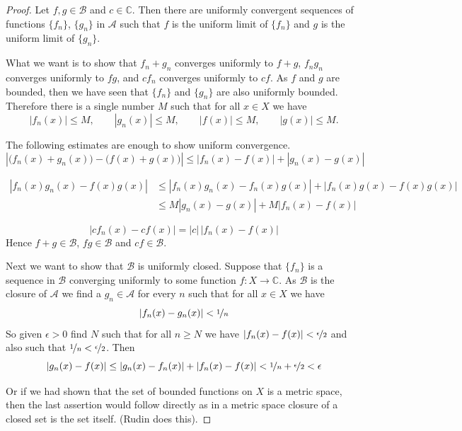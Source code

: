 \documentclass[12pt]{book}
\newcommand{\abs}[1]{\left\lvert {#1} \right\rvert}
\newcommand{\C}{{\mathbb{C}}}
\newcommand{\sA}{{\mathcal{A}}}
\newcommand{\sB}{{\mathcal{B}}}
\theoremstyle{plain}
\theoremstyle{remark}
\theoremstyle{definition}
\theoremstyle{exercise}
\theoremstyle{example}
\begin{document}
\begin{proof}
Let $f, g \in \sB$ and $c \in \C$.  Then there are uniformly convergent
sequences of functions $\{ f_n \}$, $\{ g_n \}$ in $\sA$ such that
$f$ is the uniform limit of $\{ f_n \}$ and
$g$ is the uniform limit of $\{ g_n \}$.

What we want is to show that $f_n+g_n$ converges uniformly to $f+g$,
$f_ng_n$ converges uniformly to $fg$, and
$cf_n$ converges uniformly to $cf$.  As $f$ and $g$ are bounded, then
we have seen that $\{ f_n \}$ and $\{ g_n \}$ are also uniformly bounded.
Therefore there is a single number $M$ such that for all $x \in X$ we have
\begin{equation*}
\abs{f_n(x)} \leq M, \qquad
\abs{g_n(x)} \leq M, \qquad
\abs{f(x)} \leq M, \qquad
\abs{g(x)} \leq M.
\end{equation*}

The following estimates are enough to show uniform convergence.
\begin{equation*}
\abs{\bigl(f_n(x)+g_n(x)\bigr)
-\bigl(f(x)+g(x)\bigr)}
\leq
\abs{f_n(x)-f(x)}
+\abs{g_n(x)-g(x)}
\end{equation*}

\begin{equation*}
\begin{split}
\abs{f_n(x)g_n(x)-f(x)g(x)}
& \leq
\abs{f_n(x)g_n(x)-f_n(x)g(x)}
+\abs{f_n(x)g(x)-f(x)g(x)}
\\
& \leq
M \abs{g_n(x)-g(x)}
+M \abs{f_n(x)-f(x)}
\end{split}
\end{equation*}

$$
\abs{cf_n(x)-cf(x)}
=
\abs{c}\,
\abs{f_n(x)-f(x)}
$$
Hence $f+g \in \sB$, $fg \in \sB$ and $cf \in \sB$.

Next we want to show that $\sB$ is uniformly closed.
Suppose that $\{ f_n \}$ is a sequence in $\sB$ converging
uniformly to some function $f \colon X \to \C$.
As $\sB$ is the closure of $\sA$ we find a $g_n \in \sA$ for
every $n$ such that for all $x \in X$ we have
$$
\abs{f_n(x)-g_n(x)} < \nicefrac{1}{n}
$$
So given $\epsilon > 0$ find $N$ such that for all $n \geq N$
we have $\abs{f_n(x)-f(x)} < \nicefrac{\epsilon}{2}$ and
also such that $\nicefrac{1}{n} < \nicefrac{\epsilon}{2}$.  Then
$$
\abs{g_n(x)-f(x)}
\leq
\abs{g_n(x)-f_n(x)}
+
\abs{f_n(x)-f(x)}
< \nicefrac{1}{n} + \nicefrac{\epsilon}{2} < \epsilon
$$

Or if we had shown that the set of bounded functions on $X$ is a metric
space, then the last assertion would follow directly as in a metric space
closure of a closed set is the set itself. (Rudin does this).
\end{proof}
\end{document}
